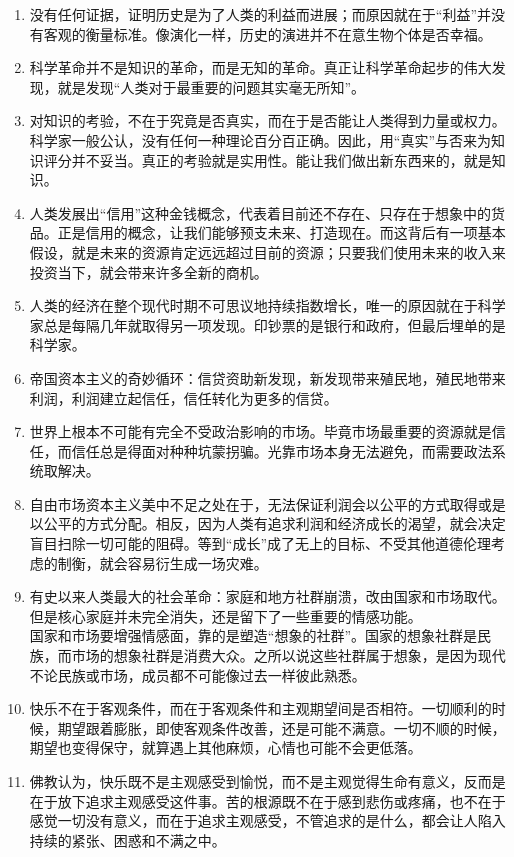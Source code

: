 \documentclass[UTF8]{ctexart}
\begin{document}
\begin{enumerate}
			\item 没有任何证据，证明历史是为了人类的利益而进展；而原因就在于“利益”并没有客观的衡量标准。像演化一样，历史的演进并不在意生物个体是否幸福。
			\item 科学革命并不是知识的革命，而是无知的革命。真正让科学革命起步的伟大发现，就是发现“人类对于最重要的问题其实毫无所知”。
			\item 对知识的考验，不在于究竟是否真实，而在于是否能让人类得到力量或权力。科学家一般公认，没有任何一种理论百分百正确。因此，用“真实”与否来为知识评分并不妥当。真正的考验就是实用性。能让我们做出新东西来的，就是知识。
			\item 人类发展出“信用”这种金钱概念，代表着目前还不存在、只存在于想象中的货品。正是信用的概念，让我们能够预支未来、打造现在。而这背后有一项基本假设，就是未来的资源肯定远远超过目前的资源；只要我们使用未来的收入来投资当下，就会带来许多全新的商机。
			\item 人类的经济在整个现代时期不可思议地持续指数增长，唯一的原因就在于科学家总是每隔几年就取得另一项发现。印钞票的是银行和政府，但最后埋单的是科学家。
			\item 帝国资本主义的奇妙循环：信贷资助新发现，新发现带来殖民地，殖民地带来利润，利润建立起信任，信任转化为更多的信贷。
			\item 世界上根本不可能有完全不受政治影响的市场。毕竟市场最重要的资源就是信任，而信任总是得面对种种坑蒙拐骗。光靠市场本身无法避免，而需要政法系统取解决。
			\item 自由市场资本主义美中不足之处在于，无法保证利润会以公平的方式取得或是以公平的方式分配。相反，因为人类有追求利润和经济成长的渴望，就会决定盲目扫除一切可能的阻碍。等到“成长”成了无上的目标、不受其他道德伦理考虑的制衡，就会容易衍生成一场灾难。
			\item 有史以来人类最大的社会革命：家庭和地方社群崩溃，改由国家和市场取代。但是核心家庭并未完全消失，还是留下了一些重要的情感功能。\\
			国家和市场要增强情感面，靠的是塑造“想象的社群”。国家的想象社群是民族，而市场的想象社群是消费大众。之所以说这些社群属于想象，是因为现代不论民族或市场，成员都不可能像过去一样彼此熟悉。
			\item 快乐不在于客观条件，而在于客观条件和主观期望间是否相符。一切顺利的时候，期望跟着膨胀，即使客观条件改善，还是可能不满意。一切不顺的时候，期望也变得保守，就算遇上其他麻烦，心情也可能不会更低落。
			\item 佛教认为，快乐既不是主观感受到愉悦，而不是主观觉得生命有意义，反而是在于放下追求主观感受这件事。苦的根源既不在于感到悲伤或疼痛，也不在于感觉一切没有意义，而在于追求主观感受，不管追求的是什么，都会让人陷入持续的紧张、困惑和不满之中。
		\end{enumerate}
		
\end{document}
